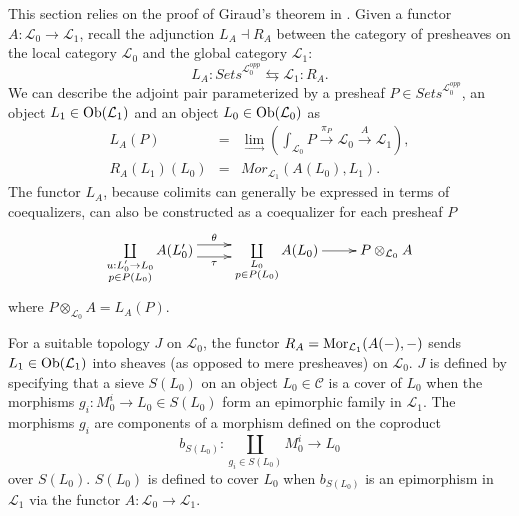 \documentclass[aps,twocolumn]{revtex4-1}
\begin{document}
This section relies on the proof of Giraud's theorem in \cite{MacLane1992}. Given a functor $A: \mathcal{L}_0 \rightarrow \mathcal{L}_1$, recall the adjunction $L_A \dashv R_A$ between the category of presheaves on the local category $\mathcal{L}_0$ and the global category $\mathcal{L}_1$:
$$
L_A: \textit{Sets}^{\mathcal{L}_0^{opp}} \leftrightarrows \mathcal{L}_1 :R_A.
$$
We can describe the adjoint pair parameterized by a presheaf $P \in \textit{Sets}^{\mathcal{L}_0^{opp}}$, an object $L_1 \in \mathop{\rm Ob}\nolimits(\mathcal{L}_1)$ and an object $L_0 \in \mathop{\rm Ob}\nolimits(\mathcal{L}_0)$ as
\begin{eqnarray*}
L_A(P) &=& \lim\limits_{\longrightarrow} \left( \int_{\mathcal{L}_0} P \xrightarrow{\pi_P} \mathcal{L}_0 \xrightarrow{A} \mathcal{L}_1 \right),\\
R_A(L_1)(L_0) &=& Mor_{\mathcal{L}_1}(A(L_0),L_1).
\end{eqnarray*}
The functor $L_A$, because colimits can generally be expressed in terms of coequalizers, can also be constructed as a coequalizer for each presheaf $P$
\begin{displaymath}
\xymatrix{
\coprod\limits_{\substack{u : L'_0 \rightarrow L_0 \\ p \in P(L_0)}}
A(L'_0)
\ar@<1ex>[r]^-{\theta} \ar@<-1ex>[r]_-{\tau}
&
\coprod\limits_{\substack{L_0 \\ p \in P(L_0)}}
A(L_0)
\ar[r]
&
P \otimes_{\mathcal{L}_0} A
}
\end{displaymath}
where $P \otimes_{\mathcal{L}_0} A = L_A(P)$.

For a suitable topology $J$ on $\mathcal{L}_0$, the functor $R_A = \mathop{\rm Mor}\nolimits_{\mathcal{L}_1}(A(-),-)$ sends $L_1 \in \mathop{\rm Ob}\nolimits(\mathcal{L}_1)$ into sheaves (as opposed to mere presheaves) on $\mathcal{L}_0$. $J$ is defined by specifying that a sieve $S(L_0)$ on an object $L_0 \in \mathcal{C}$ is a cover of $L_0$ when the morphisms $g_i : M_0^i \rightarrow L_0 \in S(L_0)$ form an epimorphic family in $\mathcal{L}_1$. The morphisms $g_i$ are components of a morphism defined on the coproduct
$$
b_{S(L_0)} : \coprod\limits_{g_i \in S(L_0)} M_0^i \longrightarrow L_0
$$
over $S(L_0)$. $S(L_0)$ is defined to cover $L_0$ when $b_{S(L_0)}$ is an epimorphism in $\mathcal{L}_1$ via the functor $A:\mathcal{L}_0 \rightarrow \mathcal{L}_1$.
\end{document}
